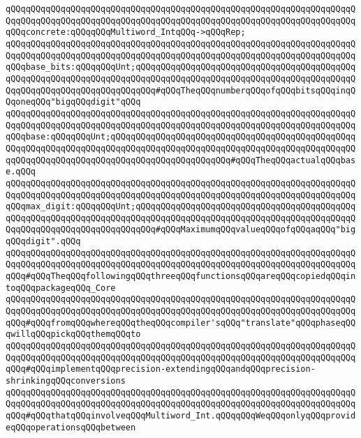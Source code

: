 \verb|qQQqqQQqqQQqqQQqqQQqqQQqqQQqqQQqqQQqqQQqqQQqqQQqqQQqqQQqqQQqqQQqqQQqqQQqqQQqqQQqqQQqqQQqqQQqqQQqqQQqqQQqqQQqqQQqqQQqqQQqqQQqqQQqqQQqqQQqqQQqqQQqconcrete:qQQqqQQqMultiword_IntqQQq->qQQqRep;|\newline
\newline
\verb|qQQqqQQqqQQqqQQqqQQqqQQqqQQqqQQqqQQqqQQqqQQqqQQqqQQqqQQqqQQqqQQqqQQqqQQqqQQqqQQqqQQqqQQqqQQqqQQqqQQqqQQqqQQqqQQqqQQqqQQqqQQqqQQqqQQqqQQqqQQqqQQqbase_bits:qQQqqQQqUnt;qQQqqQQqqQQqqQQqqQQqqQQqqQQqqQQqqQQqqQQqqQQqqQQqqQQqqQQqqQQqqQQqqQQqqQQqqQQqqQQqqQQqqQQqqQQqqQQqqQQqqQQqqQQqqQQqqQQqqQQqqQQqqQQqqQQqqQQqqQQqqQQq#qQQqTheqQQqnumberqQQqofqQQqbitsqQQqinqQQqoneqQQq"bigqQQqdigit"qQQq|\newline
\newline
\verb|qQQqqQQqqQQqqQQqqQQqqQQqqQQqqQQqqQQqqQQqqQQqqQQqqQQqqQQqqQQqqQQqqQQqqQQqqQQqqQQqqQQqqQQqqQQqqQQqqQQqqQQqqQQqqQQqqQQqqQQqqQQqqQQqqQQqqQQqqQQqqQQqbase:qQQqqQQqUnt;qQQqqQQqqQQqqQQqqQQqqQQqqQQqqQQqqQQqqQQqqQQqqQQqqQQqqQQqqQQqqQQqqQQqqQQqqQQqqQQqqQQqqQQqqQQqqQQqqQQqqQQqqQQqqQQqqQQqqQQqqQQqqQQqqQQqqQQqqQQqqQQqqQQqqQQqqQQqqQQqqQQq#qQQqTheqQQqactualqQQqbase.qQQq|\newline
\newline
\verb|qQQqqQQqqQQqqQQqqQQqqQQqqQQqqQQqqQQqqQQqqQQqqQQqqQQqqQQqqQQqqQQqqQQqqQQqqQQqqQQqqQQqqQQqqQQqqQQqqQQqqQQqqQQqqQQqqQQqqQQqqQQqqQQqqQQqqQQqqQQqqQQqmax_digit:qQQqqQQqUnt;qQQqqQQqqQQqqQQqqQQqqQQqqQQqqQQqqQQqqQQqqQQqqQQqqQQqqQQqqQQqqQQqqQQqqQQqqQQqqQQqqQQqqQQqqQQqqQQqqQQqqQQqqQQqqQQqqQQqqQQqqQQqqQQqqQQqqQQqqQQqqQQq#qQQqMaximumqQQqvalueqQQqofqQQqaqQQq"bigqQQqdigit".qQQq|\newline
\newline
\verb|qQQqqQQqqQQqqQQqqQQqqQQqqQQqqQQqqQQqqQQqqQQqqQQqqQQqqQQqqQQqqQQqqQQqqQQqqQQqqQQqqQQqqQQqqQQqqQQqqQQqqQQqqQQqqQQqqQQqqQQqqQQqqQQqqQQqqQQqqQQqqQQq#qQQqTheqQQqfollowingqQQqthreeqQQqfunctionsqQQqareqQQqcopiedqQQqintoqQQqpackageqQQq_Core|\newline
\verb|qQQqqQQqqQQqqQQqqQQqqQQqqQQqqQQqqQQqqQQqqQQqqQQqqQQqqQQqqQQqqQQqqQQqqQQqqQQqqQQqqQQqqQQqqQQqqQQqqQQqqQQqqQQqqQQqqQQqqQQqqQQqqQQqqQQqqQQqqQQqqQQq#qQQqfromqQQqwhereqQQqtheqQQqcompiler'sqQQq"translate"qQQqphaseqQQqwillqQQqpickqQQqthemqQQqto|\newline
\verb|qQQqqQQqqQQqqQQqqQQqqQQqqQQqqQQqqQQqqQQqqQQqqQQqqQQqqQQqqQQqqQQqqQQqqQQqqQQqqQQqqQQqqQQqqQQqqQQqqQQqqQQqqQQqqQQqqQQqqQQqqQQqqQQqqQQqqQQqqQQqqQQq#qQQqimplementqQQqprecision-extendingqQQqandqQQqprecision-shrinkingqQQqconversions|\newline
\verb|qQQqqQQqqQQqqQQqqQQqqQQqqQQqqQQqqQQqqQQqqQQqqQQqqQQqqQQqqQQqqQQqqQQqqQQqqQQqqQQqqQQqqQQqqQQqqQQqqQQqqQQqqQQqqQQqqQQqqQQqqQQqqQQqqQQqqQQqqQQqqQQq#qQQqthatqQQqinvolveqQQqMultiword_Int.qQQqqQQqWeqQQqonlyqQQqprovideqQQqoperationsqQQqbetween|\newline
